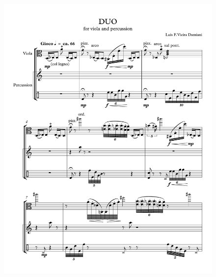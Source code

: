 \begin{figure}[h!]
    \centering
	\includegraphics[width=6.5in]{figures/Viola_Percussion_1.pdf}
\end{figure}

